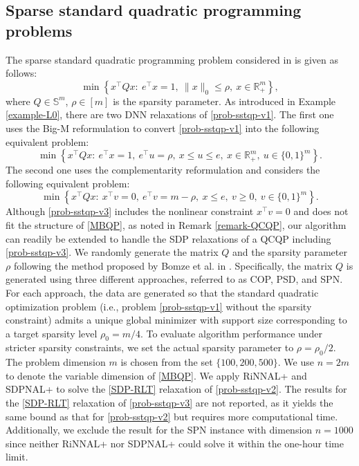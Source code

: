 \documentclass[11pt]{article}
\theoremstyle{plain}
\def\R{\mathbb{R}}
\def\S{\mathbb{S}}
\begin{document}

\subsection{Sparse standard quadratic programming problems}\label{subsec-SStQP}

The sparse standard quadratic programming problem considered in \cite{bomze2024tighter} is given as follows:
\begin{equation}\label{prob-sstqp-v1}
\min\left\{x^{\top} Q x:\ e^\top x= 1,\ \|x\|_0\leq \rho,\ x\in\R^m_+\right\},
\end{equation}
where $Q\in \S^m$, $\rho \in [m]$ is the sparsity parameter. As introduced in Example \ref{example-L0}, there are two DNN relaxations of \eqref{prob-sstqp-v1}. The first one uses the Big-M reformulation to convert \eqref{prob-sstqp-v1} into the following equivalent problem:
\begin{equation}\label{prob-sstqp-v2}
\min\left\{x^{\top} Q x:\ e^\top x= 1,\ e^\top u=\rho,\ x\leq u\leq e,\ x\in\R_+^m,\ u \in\{0,1\}^m\right\}.
\tag{SStQP}
\end{equation}
The second one uses the complementarity reformulation and considers the following equivalent problem:
\begin{equation}\label{prob-sstqp-v3}
\min\left\{x^{\top} Q x:\  x^\top v=0,\ e^\top v=m-\rho,\ x\leq e,\ v\geq 0,\ v\in \{0,1\}^m \right\}.
\end{equation}
Although \eqref{prob-sstqp-v3} includes the nonlinear constraint $x^\top v = 0$ and does not fit the structure of \eqref{MBQP}, as noted in Remark \ref{remark-QCQP}, our algorithm can readily be extended to handle the SDP relaxations of a QCQP including \eqref{prob-sstqp-v3}. 
We randomly generate the matrix $Q$ and the sparsity parameter $\rho$ following the method proposed by Bomze et al. in \cite{bomze2024tighter}. Specifically, the matrix $Q$ is generated using three different approaches, referred to as COP, PSD, and SPN. For each approach, the data are generated so that the standard quadratic optimization problem (i.e., problem \eqref{prob-sstqp-v1} without the sparsity constraint) admits a unique global minimizer with support size corresponding to a target sparsity level $\rho_0 = m/4$.  
To evaluate algorithm performance under stricter sparsity constraints, we set the actual sparsity parameter to $\rho = \rho_0 / 2$. The problem dimension $m$ is chosen from the set $\{100, 200, 500\}$.
We use $n = 2m$ to denote the variable dimension of \eqref{MBQP}. We apply RiNNAL+ and SDPNAL+ to solve the \eqref{SDP-RLT} relaxation of \eqref{prob-sstqp-v2}. The results for the \eqref{SDP-RLT} relaxation of \eqref{prob-sstqp-v3} are not reported, as it yields the same bound as that for \eqref{prob-sstqp-v2} but requires more computational time. 
Additionally, we exclude the result for the SPN instance with dimension $n=1000$ since neither RiNNAL+ nor SDPNAL+ could solve it within the one-hour time limit.
\end{document}
